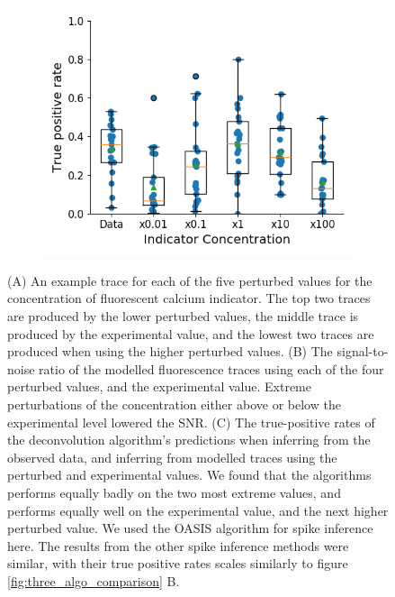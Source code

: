 \begin{figure}[p]
\begin{subfigure}{0.45\textwidth}
        \includegraphics[width=\linewidth]{figures/calcium_chapter/indictor_perturbed_oasis_first_paper.png}
        \caption{}
        \label{fig:indicator_perturbed_inference}
    \end{subfigure}
    \caption{(A) An example trace for each of the five perturbed values for the concentration of fluorescent calcium indicator. The top two traces are produced by the lower perturbed values, the middle trace is produced by the experimental value, and the lowest two traces are produced when using the higher perturbed values. (B) The signal-to-noise ratio of the modelled fluorescence traces using each of the four perturbed values, and the experimental value. Extreme perturbations of the concentration either above or below the experimental level lowered the SNR. (C) The true-positive rates of the deconvolution algorithm's predictions when inferring from the observed data, and inferring from modelled traces using the perturbed and experimental values. We found that the algorithms performs equally badly on the two most extreme values, and performs equally well on the experimental value, and the next higher perturbed value. We used the OASIS algorithm for spike inference here. The results from the other spike inference methods were similar, with their true positive rates scales similarly to figure \ref{fig:three_algo_comparison} B.}
    \label{fig:indicator_perturbed}
\end{figure}

